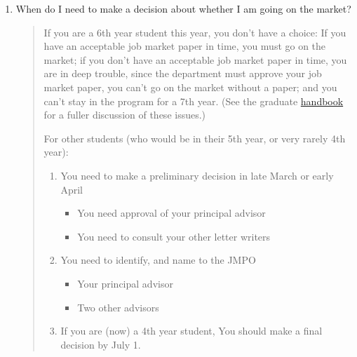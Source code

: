 \documentclass{\classes/econtex}
\providecommand\phantomsection{}
\begin{document}
\begin{enumerate}
\begin{quote}
    \phantomsection\hypertarget{DecideByWhen}{}
    
  \end{quote}

\item  When do I need to make a decision about whether I am going on
  the market?

  \begin{quote}
    If you are a 6th year student this year, you don't have a choice: If
    you have an acceptable job market paper in time, you must go on the
    market; if you don't have an acceptable job market paper in time, you
    are in deep trouble, since the department must approve your job market
    paper, you can't go on the market without a paper; and you can't stay
    in the program for a 7th year.  (See the graduate \href{https://www.econ2.jhu.edu/pdf/GraduateStudentHandbook_2023-2024.pdf}{handbook} for a fuller discussion of these issues.) 

    For other students (who would be in their 5th year, or very rarely 4th year):

    \begin{enumerate}
    \item You need to make a preliminary decision in late March or early April
      \begin{itemize}
      \item You need approval of your principal advisor
      \item You need to consult your other letter writers
      \end{itemize}
    \item You need to identify, and name to the JMPO
      \begin{itemize}
      \item Your principal advisor
      \item Two other advisors
      \end{itemize}
    \item If you are (now) a 4th year student, You should make a final decision by July 1.  
    \end{enumerate}
    
    \begin{comment}

      In the dept meeting on 2006-10-17 a question was raised about
      whether we are really serious about our policy, as stated by Larry,
      that ``there is no such thing as a 7th year student.''  

      The answer is yes.


\end{comment}
\end{quote}
\end{enumerate}
\end{document}
